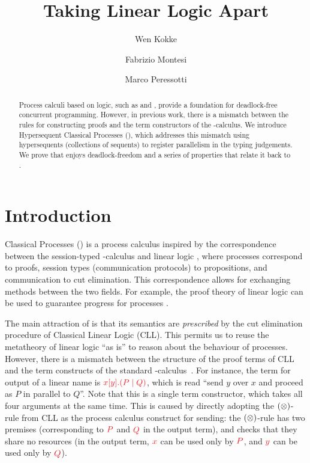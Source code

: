 \documentclass[submission,copyright,creativecommons]{eptcs}
\title{Taking Linear Logic Apart}
\author{%
  Wen Kokke
  \institute{University of Edinburgh\\ Edinburgh, Scotland}
  \email{wen.kokke@ed.ac.uk}
  \and
  Fabrizio Montesi
  \institute{University of Southern Denmark\\ Odense, Denmark}
  \email{fmontesi@imada.sdu.dk}
  \and
  Marco Peressotti
  \institute{University of Southern Denmark\\ Odense, Denmark}
  \email{peressotti@imada.sdu.dk}}
\begin{document}
\maketitle

\begin{abstract}
  Process calculi based on logic, such as \piDILL and \cp, provide a foundation for deadlock-free concurrent programming. However, in previous work, there is a mismatch between the rules for constructing proofs and the term constructors of the \textpi-calculus. We introduce Hypersequent Classical Processes (\hcp), which addresses this mismatch using hypersequents (collections of sequents) to register parallelism in the typing judgements. We prove that \hcp enjoys deadlock-freedom and a series of properties that relate it back to \cp.
\end{abstract}

\section{Introduction}
\label{sec:introduction}

Classical Processes (\cp) \citep{wadler2012} is a process calculus inspired by the correspondence between the session-typed \textpi-calculus and linear logic \citep{caires2010}, where processes correspond to proofs, session types (communication protocols) to propositions, and communication to cut elimination. This correspondence allows for exchanging methods between the two fields. For example, the proof theory of linear logic can be used to guarantee progress for processes \citep{caires2010,wadler2012}.

The main attraction of \cp is that its semantics are \emph{prescribed} by the cut elimination procedure of Classical Linear Logic (CLL). This permits us to reuse the metatheory of linear logic ``as is'' to reason about the behaviour of processes. However, there is a mismatch between the structure of the proof terms of CLL and the term constructs of the standard \textpi-calculus~\citep{milner1992a,milner1992b}. For instance, the term for output of a linear name is $\tm{\cpSend{x}{y}{P}{Q}}$, which is read ``send $y$ over $x$ and proceed as $P$ in parallel to $Q$''. Note that this is a single term constructor, which takes all four arguments at the same time. This is caused by directly adopting the $(\otimes)$-rule from CLL as the process calculus construct for sending: the $(\otimes)$-rule has two premises (corresponding to $\tm P$ and $\tm Q$ in the output term), and checks that they share no resources (in the output term, $\tm x$ can be used only by $\tm P$, and $\tm y$ can be used only by $\tm Q$).
\end{document}
